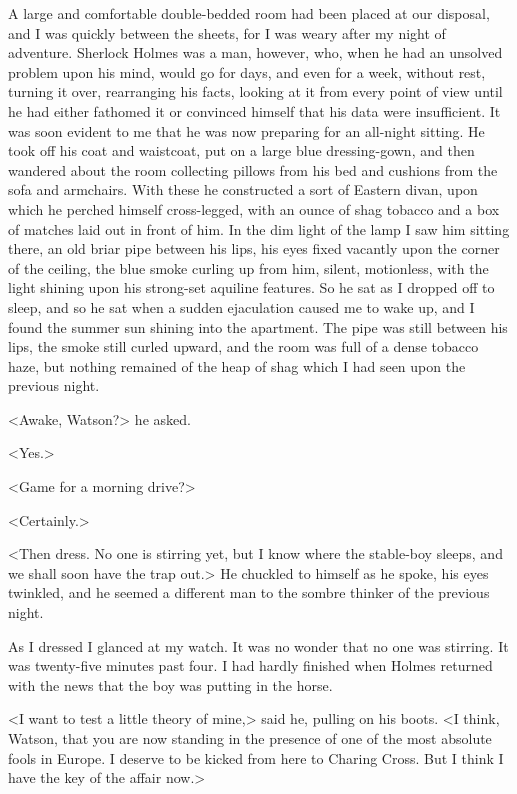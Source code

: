 A large and comfortable double-bedded room had been placed at our disposal, and I was quickly between the sheets, for I was weary after my night of adventure. Sherlock Holmes was a man, however, who, when he had an unsolved problem upon his mind, would go for days, and even for a week, without rest, turning it over, rearranging his facts, looking at it from every point of view until he had either fathomed it or convinced himself that his data were insufficient. It was soon evident to me that he was now preparing for an all-night sitting. He took off his coat and waistcoat, put on a large blue dressing-gown, and then wandered about the room collecting pillows from his bed and cushions from the sofa and armchairs. With these he constructed a sort of Eastern divan, upon which he perched himself cross-legged, with an ounce of shag tobacco and a box of matches laid out in front of him. In the dim light of the lamp I saw him sitting there, an old briar pipe between his lips, his eyes fixed vacantly upon the corner of the ceiling, the blue smoke curling up from him, silent, motionless, with the light shining upon his strong-set aquiline features. So he sat as I dropped off to sleep, and so he sat when a sudden ejaculation caused me to wake up, and I found the summer sun shining into the apartment. The pipe was still between his lips, the smoke still curled upward, and the room was full of a dense tobacco haze, but nothing remained of the heap of shag which I had seen upon the previous night.

<Awake, Watson?> he asked.

<Yes.>

<Game for a morning drive?>

<Certainly.>

<Then dress. No one is stirring yet, but I know where the stable-boy sleeps, and we shall soon have the trap out.> He chuckled to himself as he spoke, his eyes twinkled, and he seemed a different man to the sombre thinker of the previous night.

As I dressed I glanced at my watch. It was no wonder that no one was stirring. It was twenty-five minutes past four. I had hardly finished when Holmes returned with the news that the boy was putting in the horse.

<I want to test a little theory of mine,> said he, pulling on his boots. <I think, Watson, that you are now standing in the presence of one of the most absolute fools in Europe. I deserve to be kicked from here to Charing Cross. But I think I have the key of the affair now.>

